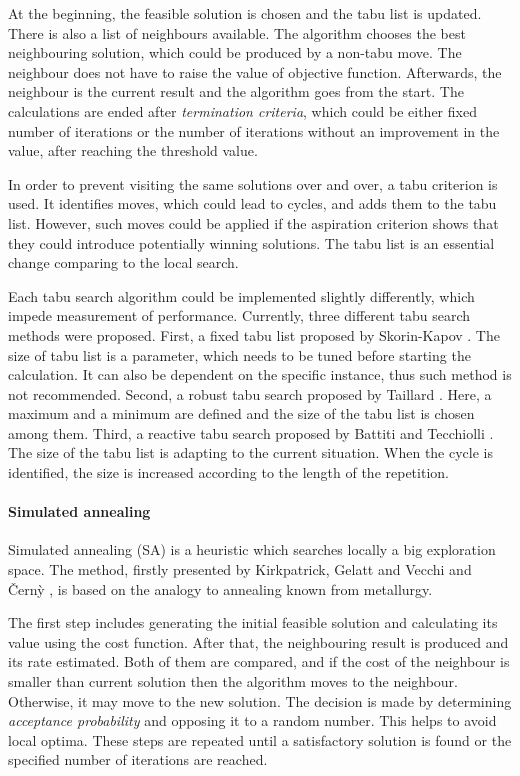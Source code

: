 \documentclass[english,a4paper,twoside]{ppfcmthesis}
\begin{document}
At the beginning, the feasible solution is chosen and the tabu list is updated.
There is also a list of neighbours available.
The algorithm chooses the best neighbouring solution, which could be produced by a non-tabu move.
The neighbour does not have to raise the value of objective function.
Afterwards, the neighbour is the current result and the algorithm goes from the start.
The calculations are ended after \textit{termination criteria}, which could be either fixed number of iterations or the number of iterations without an improvement in the value, after reaching the threshold value.

In order to prevent visiting the same solutions over and over, a tabu criterion is used.
It identifies moves, which could lead to cycles, and adds them to the tabu list.
However, such moves could be applied if the aspiration criterion shows that they could introduce potentially winning solutions.
The tabu list is an essential change comparing to the local search.

Each tabu search algorithm could be implemented slightly differently, which impede measurement of performance.
Currently, three different tabu search methods were proposed.
First, a fixed tabu list proposed by Skorin-Kapov \cite{skorin1990tabu}.
The size of tabu list is a parameter, which needs to be tuned before starting the calculation.
It can also be dependent on the specific instance, thus such method is not recommended.
Second, a robust tabu search proposed by Taillard \cite{taillard1991robust}.
Here, a maximum and a minimum are defined and the size of the tabu list is chosen among them.
Third, a reactive tabu search proposed by Battiti and Tecchiolli \cite{battiti1994reactive}.
The size of the tabu list is adapting to the current situation.
When the cycle is identified, the size is increased according to the length of the repetition.

\paragraph{Simulated annealing}

Simulated annealing (SA) is a heuristic which searches locally a big exploration space.
The method, firstly presented by Kirkpatrick, Gelatt and Vecchi \cite{kirkpatrick1983optimization} and {\v{C}}ern{\`y} \cite{vcerny1985thermodynamical}, is based on the analogy to annealing known from metallurgy.

The first step includes generating the initial feasible solution and calculating its value using the cost function.
After that, the neighbouring result is produced and its rate estimated.
Both of them are compared, and if the cost of the neighbour is smaller than current solution then the algorithm moves to the neighbour.
Otherwise, it may move to the new solution.
The decision is made by determining \textit{acceptance probability} and opposing it to a random number.
This helps to avoid local optima.
These steps are repeated until a satisfactory solution is found or the specified number of iterations are reached.
\end{document}
